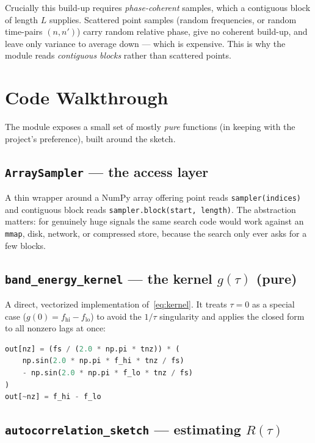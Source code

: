 \documentclass[11pt]{article}
\newcommand{\R}{R}
\begin{document}
Crucially this build-up requires \emph{phase-coherent} samples, which a
contiguous block of length $L$ supplies. Scattered point samples (random
frequencies, or random time-pairs $(n,n')$) carry random relative phase, give no
coherent build-up, and leave only variance to average down --- which is
expensive. This is why the module reads \emph{contiguous blocks} rather than
scattered points.

\section{Code Walkthrough}

The module exposes a small set of mostly \emph{pure} functions (in keeping with
the project's preference), built around the sketch.

\subsection{\texttt{ArraySampler} --- the access layer}

A thin wrapper around a NumPy array offering point reads
\verb|sampler(indices)| and contiguous block reads
\verb|sampler.block(start, length)|. The abstraction matters: for genuinely huge
signals the same search code would work against an \texttt{mmap}, disk, network,
or compressed store, because the search only ever asks for a few blocks.

\subsection{\texttt{band\_energy\_kernel} --- the kernel $g(\tau)$ (pure)}

A direct, vectorized implementation of~\eqref{eq:kernel}. It treats $\tau=0$ as a
special case ($g(0)=f_{\mathrm{hi}}-f_{\mathrm{lo}}$) to avoid the $1/\tau$
singularity and applies the closed form to all nonzero lags at once:
\begin{lstlisting}[language=Python]
out[nz] = (fs / (2.0 * np.pi * tnz)) * (
    np.sin(2.0 * np.pi * f_hi * tnz / fs)
    - np.sin(2.0 * np.pi * f_lo * tnz / fs)
)
out[~nz] = f_hi - f_lo
\end{lstlisting}

\subsection{\texttt{autocorrelation\_sketch} --- estimating $\R(\tau)$}
\end{document}
